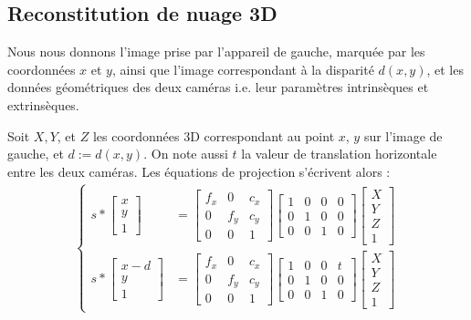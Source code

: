 \documentclass[titlepage,11pt,a4paper]{article}
\begin{document}
\subsection{Reconstitution de nuage 3D}
\par Nous nous donnons l'image prise par l'appareil de gauche, marquée par les coordonnées $x$ et $y$, ainsi que l'image correspondant à la disparité $d \left( x, y \right)$, et les données géométriques des deux caméras i.e. leur paramètres intrinsèques et extrinsèques. 
\par Soit $X, Y$, et $Z$ les coordonnées 3D correspondant au point $x$, $y$ sur l'image de gauche, et $ d:=d\left(x, y\right)$. On note aussi $t$ la valeur de translation horizontale entre les deux caméras. Les équations de projection s'écrivent alors :
\begin{displaymath}
	\begin{split}
	\left\lbrace
	\begin{array}{cc}
	s * 
		\begin{bmatrix}
			x \\
			y \\
			1
		\end{bmatrix}
		 &=
		\begin{bmatrix}
			f_{x} & 0 & c_{x} \\
			0 & f_{y} & c_{y} \\
			0 & 0 & 1
		\end{bmatrix}
		\begin{bmatrix}
			1 & 0 & 0 & 0 \\
			0 & 1 & 0 & 0 \\
			0 & 0 & 1 & 0
		\end{bmatrix}
		\begin{bmatrix}
			X \\
			Y \\
			Z \\
			1
		\end{bmatrix}
		\\
	s * 
		\begin{bmatrix}
			x - d \\
			y \\
			1
		\end{bmatrix}
		 &=
		\begin{bmatrix}
			f_{x} & 0 & c_{x} \\
			0 & f_{y} & c_{y} \\
			0 & 0 & 1
		\end{bmatrix}
		\begin{bmatrix}
			1 & 0 & 0 & t \\
			0 & 1 & 0 & 0 \\
			0 & 0 & 1 & 0
		\end{bmatrix}
		\begin{bmatrix}
			X \\
			Y \\
			Z \\
			1
		\end{bmatrix}
	\end{array}\right.
	\end{split}
\end{displaymath}
\end{document}
